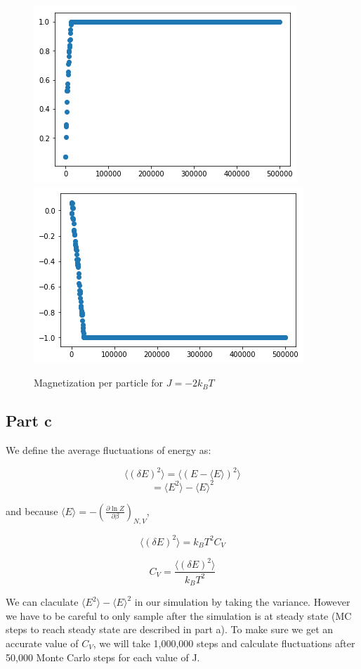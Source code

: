 \documentclass{article}
\begin{document}
			\begin{figure}[H]
				\centering
				\includegraphics[scale=0.5]{J=2m1}
				\includegraphics[scale=0.5]{J=2m2}
				\caption{Magnetization per particle for $J=-2k_BT$}
			\end{figure}






\subsection*{Part c}

	We define the average fluctuations of energy as:

	\[\langle (\delta E)^2\rangle = \langle (E- \langle E \rangle )^2 \rangle\]
	\[= \langle E^2 \rangle - \langle E \rangle ^2\]


	\noindent and because $\langle E \rangle = - (\frac{\partial \ln Z}{\partial \beta})_{N,V}$, 

	\[\langle(\delta E)^2 \rangle = k_B T^2 C_V\]

	\[C_V = \frac{\langle(\delta E)^2 \rangle}{k_B T^2}\]

	\noindent We can claculate $\langle E^2 \rangle - \langle E \rangle ^2$ in our simulation by taking the variance. However we have to be careful to only sample after the simulation is at steady state (MC steps to reach steady state are described in part a). To make sure we get an accurate value of $C_V$, we will take 1,000,000 steps and calculate fluctuations after 50,000 Monte Carlo steps for each value of J.
\end{document}
